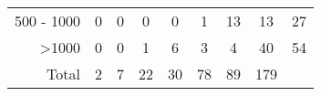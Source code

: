 \begin{table}[]
{\begin{tabular}{r|ccccccc|c}
            500 - 1000                                            & 0                                                & 0                         & 0                          & 0                          & \cellcolor[HTML]{FFFDFA}1  & \cellcolor[HTML]{FFEABF}13 & \cellcolor[HTML]{FFEABF}13 & 27                                              \\
            \textgreater 1000                                     & 0                                                & 0                         & \cellcolor[HTML]{FFFDFA}1  & \cellcolor[HTML]{FFF5E1}6  & \cellcolor[HTML]{FFFAF0}3  & \cellcolor[HTML]{FFF8EB}4  & \cellcolor[HTML]{FFBD39}40 & 54                                              \\ \hline
            Total                                                 & 2                                                & 7                         & 22                         & 30                         & 78                         & 89                         & 179                        &                                                 \\ \hline
        \end{tabular}%
    }
\end{table}